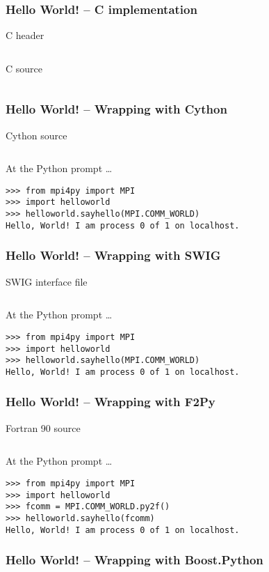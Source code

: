\begin{frame}[fragile]
  \frametitle{Hello World! -- C implementation}
  \begin{block}{C header}
    \footnotesize
    \inputminted[linenos]{c}{wrap/helloworld.h}
  \end{block}
  \begin{block}{C source}
    \footnotesize
    \inputminted[linenos]{c}{wrap/helloworld.c}
  \end{block}
\end{frame}
    
\begin{frame}[fragile]
  \frametitle{Hello World! -- Wrapping with \textbf{Cython}}
  \begin{block}{Cython source}
    \footnotesize
    \inputminted[linenos]{cython}{wrap/helloworld.pyx}
  \end{block}
  \begin{block}{At the Python prompt \ldots}
    \footnotesize
\begin{verbatim}
>>> from mpi4py import MPI
>>> import helloworld
>>> helloworld.sayhello(MPI.COMM_WORLD)
Hello, World! I am process 0 of 1 on localhost.
\end{verbatim}
  \end{block}
\end{frame}

\begin{frame}[fragile]
  \frametitle{Hello World! -- Wrapping with \textbf{SWIG}}
  \begin{block}{SWIG interface file}
    \footnotesize
    \inputminted[linenos]{c}{wrap/helloworld.i}
  \end{block}
  \begin{block}{At the Python prompt \ldots}
    \footnotesize
\begin{verbatim}
>>> from mpi4py import MPI
>>> import helloworld
>>> helloworld.sayhello(MPI.COMM_WORLD)
Hello, World! I am process 0 of 1 on localhost.
\end{verbatim}
  \end{block}
\end{frame}

\begin{frame}[fragile]
  \frametitle{Hello World! -- Wrapping with \textbf{F2Py}}
  \begin{block}{Fortran 90 source}
    \footnotesize
    \inputminted[linenos]{fortran}{wrap/helloworld.f90}
  \end{block}
  \begin{block}{At the Python prompt \ldots}
    \footnotesize
\begin{verbatim}
>>> from mpi4py import MPI
>>> import helloworld
>>> fcomm = MPI.COMM_WORLD.py2f()
>>> helloworld.sayhello(fcomm)
Hello, World! I am process 0 of 1 on localhost.
\end{verbatim}
  \end{block}
\end{frame}

\begin{frame}[fragile]
  \frametitle{Hello World! -- Wrapping with \textbf{Boost.Python}}
  \footnotesize
  \inputminted[linenos]{cpp}{wrap/helloworld.cxx}
\end{frame}
